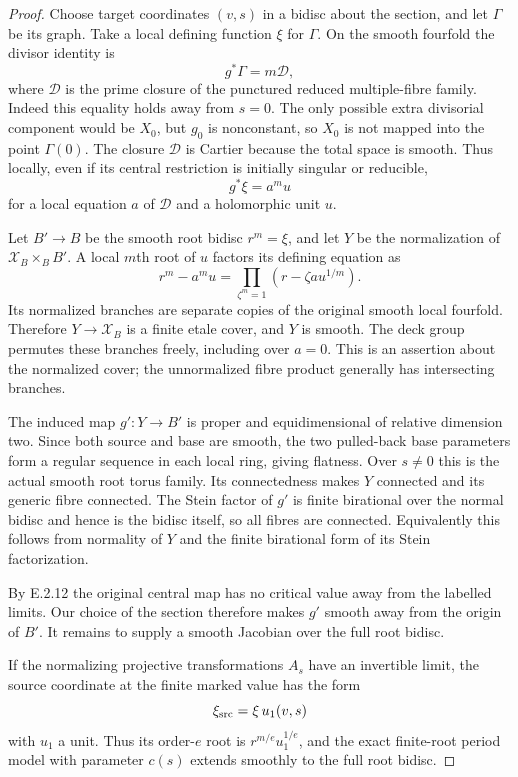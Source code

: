\begin{proof}
Choose target coordinates $(v,s)$ in a bidisc about
the section, and let $\Gamma$ be its graph.  Take a
local defining function $\xi$ for $\Gamma$.
On the smooth fourfold the divisor identity is
\[
 g^*\Gamma=m\mathcal D,
\]
where $\mathcal D$ is the prime closure of the
punctured reduced multiple-fibre family.  Indeed
this equality holds away from $s=0$.  The only
possible extra divisorial component would be
$X_0$, but $g_0$ is nonconstant, so $X_0$ is not
mapped into the point $\Gamma(0)$.  The closure
$\mathcal D$ is Cartier because the total space
is smooth.  Thus locally, even if its central
restriction is initially singular or reducible,
\[
 g^*\xi=a^m u
\]
for a local equation $a$ of $\mathcal D$ and a
holomorphic unit $u$.

Let $B'\to B$ be the smooth root bidisc
$r^m=\xi$, and let $Y$ be the normalization
of $\mathcal X_B\times_B B'$.  A local $m$th
root of $u$ factors its defining equation as
\[
 r^m-a^m u=
 \prod_{\zeta^m=1}(r-\zeta a u^{1/m}).
\]
Its normalized branches are separate copies of
the original smooth local fourfold.  Therefore
$Y\to\mathcal X_B$ is a finite etale cover,
and $Y$ is smooth.  The deck group permutes these
branches freely, including over $a=0$.
This is an assertion about the normalized cover;
the unnormalized fibre product generally has
intersecting branches.

The induced map $g':Y\to B'$ is proper and
equidimensional of relative dimension two.
Since both source and base are smooth, the
two pulled-back base parameters form a regular
sequence in each local ring, giving flatness.
Over $s\ne0$ this is the actual smooth root
torus family.  Its connectedness makes $Y$
connected and its generic fibre connected.
The Stein factor of $g'$ is finite birational
over the normal bidisc and hence is the
bidisc itself, so all fibres are connected.
Equivalently this follows from normality of
$Y$ and the finite birational form of its
Stein factorization.

By E.2.12 the original central map has no
critical value away from the labelled limits.
Our choice of the section therefore makes
$g'$ smooth away from the origin of $B'$.
It remains to supply a smooth Jacobian over
the full root bidisc.

If the normalizing projective transformations
$A_s$ have an invertible limit, the source
coordinate at the finite marked value has
the form
\[
 \xi_{\rm src}=\xi\,u_1(v,s)
\]
with $u_1$ a unit.  Thus its order-$e$ root
is $r^{m/e}u_1^{1/e}$, and the exact finite-root
period model with parameter $c(s)$ extends
smoothly to the full root bidisc.


\end{proof}
